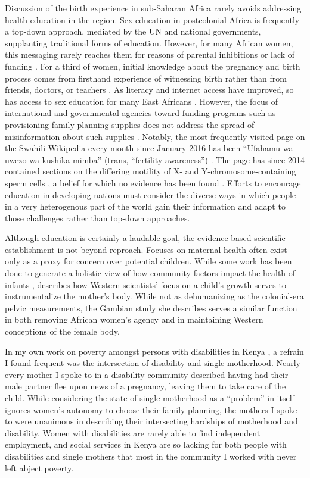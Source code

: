 \documentclass[american]{../../../coursework}
\begin{document}
Discussion of the birth experience in sub-Saharan Africa rarely avoids
addressing health education in the region. Sex education in postcolonial 
Africa is frequently a top-down approach, mediated by the UN and national
governments, supplanting traditional forms of education. However, for many
African women, this messaging rarely reaches them for reasons of parental
inhibitions \parencite{Mbu07} or lack of funding \parencite{Agb11}. For a
third of women, initial knowledge about the pregnancy and birth process comes
from firsthand experience of witnessing birth rather than from friends,
doctors, or teachers \parencite{Cha90}. As literacy and internet access have
improved, so has access to sex education for many East Africans
\parencite{Mee95}. However, the focus of international and governmental
agencies toward funding programs such as provisioning family planning supplies
does not address the spread of misinformation about such supplies
\parencite{Chi10}. Notably, the most frequently-visited page on the Swahili
Wikipedia every month since January 2016 has been ``Ufahamu wa uwezo wa
kushika mimba'' (trans, ``fertility awareness'') \parencite{Wik}. The page has
since 2014 contained sections on the differing motility of X- and
Y-chromosome-containing sperm cells \parencite{Ufa141}, a belief for which no
evidence has been found \parencite{Hos01}. Efforts to encourage education in
developing nations must consider the diverse ways in which people in a very
heterogenous part of the world gain their information and adapt to those
challenges rather than top-down approaches.

Although education is certainly a laudable goal, the evidence-based scientific
establishment is not beyond reproach. Focuses on maternal health often exist
only as a proxy for concern over potential children. While some work has been
done to generate a holistic view of how community factors impact the health of
infants \parencite{Mag00}, \textcite{Rei19} describes how Western scientists'
focus on a child's growth serves to instrumentalize the mother's body. While
not as dehumanizing as the colonial-era pelvic measurements, the Gambian study
she describes serves a similar function in both removing African women's
agency and in maintaining Western conceptions of the female body.

In my own work on poverty amongst persons with disabilities in Kenya
\parencite{Leo19}, a refrain I found frequent was the intersection of
disability and single-motherhood. Nearly every mother I spoke to in a
disability community described having had their male partner flee upon news of
a pregnancy, leaving them to take care of the child. While considering the
state of single-motherhood as a ``problem'' in itself
\parencite[for an example, see][]{Oma95} ignores women's autonomy to choose
their family planning, the mothers I spoke to were unanimous in describing
their intersecting hardships of motherhood and disability. Women with
disabilities are rarely able to find independent employment, and social
services in Kenya are so lacking for both people with disabilities and single
mothers that most in the community I worked with never left abject poverty.
\end{document}
